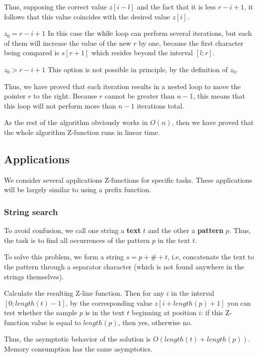 Thus, supposing the correct value $z [i-l]$ and the fact that it is less $r-i +1$, it follows that this value coincides with the desired value $z [i]$.

$z_0 = r-i +1$
In this case the $\rm while$ loop can perform several iterations, but each of them will increase the value of the new $r$ by one, because the first character being compared is $s [r +1]$ which resides beyond the interval $[l; r]$.

$z_0> r-i +1$
This option is not possible in principle, by the definition of $z_0$.

Thus, we have proved that each iteration results in a nested loop to move the pointer $r$ to the right. Because $r$ cannot be greater than $n-1$, this means that this loop will not perform more than $n-1$ iterations total.

As the rest of the algorithm obviously works in $O (n)$, then we have proved that the whole algorithm Z-function runs in linear time.

\subsection{ Applications }

We consider several applications Z-functions for specific tasks. These applications will be largely similar to using a prefix function.

\subsubsection{ String search }

To avoid confusion, we call one string a \textbf{text} $t$ and the other a \textbf{pattern} $p$. Thus, the task is to find all occurrences of the pattern $p$ in the text $t$.

To solve this problem, we form a string $s = p + \# + t$, i.e, concatenate the text to the pattern through a separator character (which is not found anywhere in the strings themselves).

Calculate the resulting Z-line function. Then for any $i$ in the interval $[0; length (t) -1]$, by the corresponding value $z [i + length (p) + 1]$ you can test whether the sample $p$ is in the text $t$ beginning at position $i$: if this Z-function value is equal to $length (p)$, then yes, otherwise no.

Thus, the asymptotic behavior of the solution is $O(length (t) + length (p))$. Memory consumption has the same asymptotics.

